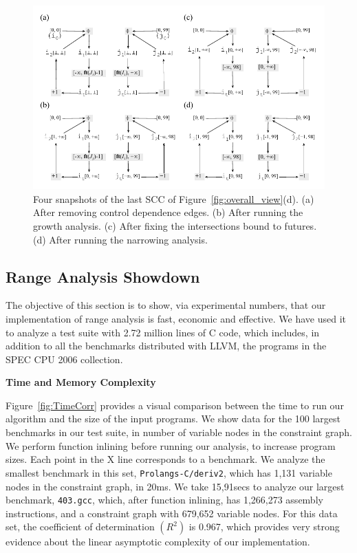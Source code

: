 \documentclass{paper}
\begin{document}
\begin{figure}[t!]
\begin{center}
\includegraphics[width=\textwidth]{images/ex_partition_grow_crop}
\end{center}
\caption{\label{fig:ex_partition_grow_crop}
Four snapshots of the last SCC of Figure~\ref{fig:overall_view}(d).
(a) After removing control dependence edges.
(b) After running the growth analysis.
(c) After fixing the intersections bound to futures.
(d) After running the narrowing analysis.}
\end{figure}

\subsection{Range Analysis Showdown}
\label{sub:showdown}

The objective of this section is to show, via experimental numbers, that our
implementation of range analysis is fast, economic and effective.
We have used it to analyze a test suite with 2.72 million lines of C code,
which includes, in addition to all the benchmarks distributed with LLVM,
the programs in the SPEC CPU 2006 collection.

\noindent
\textbf{Time and Memory Complexity}

Figure~\ref{fig:TimeCorr} provides a visual comparison between the time to
run our algorithm and the size of the input programs.
We show data for the 100 largest benchmarks in our test suite, in number
of variable nodes in the constraint graph.
We perform function inlining before running our analysis, to increase program
sizes.
Each point in the X line corresponds to a benchmark.
We analyze the smallest benchmark in this set, \texttt{Prolangs-C/deriv2}, which
has 1,131 variable nodes in the constraint graph, in 20ms.
We take 15,91secs to analyze our largest benchmark, \texttt{403.gcc}, which,
after function inlining, has 1,266,273 assembly instructions, and a
constraint graph with 679,652 variable nodes.
For this data set, the coefficient of determination $(R^2)$ is 0.967, which
provides very strong evidence about the linear asymptotic complexity of our
implementation.
\end{document}
